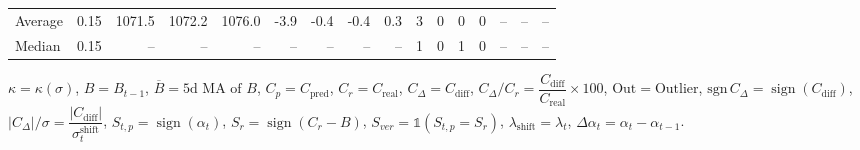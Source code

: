 \begin{threeparttable}
{\begin{tabular}{lrrrrrrrrrrrrrrr}
Average &     0.15 & 1071.5 & 1072.2 & 1076.0 &       -3.9 &           -0.4 &                     -0.4 &                 0.3 &              3 &         0 &     0 &         0 &         -- &        -- &             -- \\
 Median &     0.15 &     -- &     -- &     -- &         -- &             -- &                       -- &                  -- &              1 &         0 &     1 &         0 &         -- &        -- &             -- \\
\bottomrule
\end{tabular}
}
\begin{tablenotes}\footnotesize
\item $\kappa=\kappa(\sigma)$, $B=B_{t-1}$, $\overline{B}=\text{5d MA of }B$, $C_p=C_{\text{pred}}$, $C_r=C_{\text{real}}$, $C_\Delta=C_{\text{diff}}$, $C_\Delta/C_r=\dfrac{C_{\text{diff}}}{C_{\text{real}}}\times100$, $\mathrm{Out}=\text{Outlier}$, $\mathrm{sgn}\,C_\Delta=\operatorname{sign}(C_{\text{diff}})$, $|C_\Delta|/\sigma=\dfrac{|C_{\text{diff}}|}{\sigma_t^{\text{shift}}}$, $S_{t,p}=\operatorname{sign}(\alpha_t)$, $S_r=\operatorname{sign}(C_r - B)$, $S_{ver}=\mathbb{1}(S_{t,p}=S_r)$, $\lambda_{\text{shift}}=\lambda_t$, $\Delta\alpha_t=\alpha_t-\alpha_{t-1}$.\end{tablenotes}
\end{threeparttable}
\endgroup

